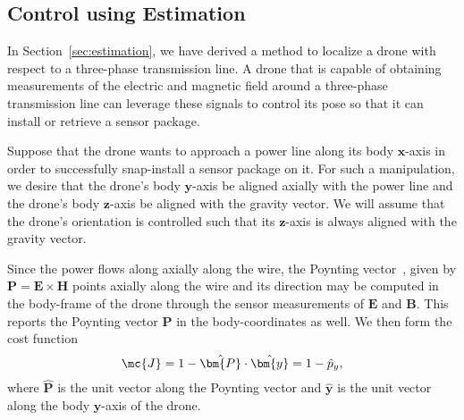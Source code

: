 % 
% 
% 
% 
\subsection{Control using Estimation}
\label{ssec:ctrl_w_est}

In Section~\ref{sec:estimation}, we have derived a method to localize a drone
with respect to a three-phase transmission line. A drone that is capable of
obtaining measurements of the electric and magnetic field around a three-phase
transmission line can leverage these signals to control its pose so that it can
install or retrieve a sensor package.

Suppose that the drone wants to approach a power line along its body
$\bm{x}$-axis in order to successfully snap-install a sensor package on it. For
such a manipulation, we desire that the drone's body $\bm{y}$-axis be aligned
axially with the power line and the drone's body $\bm{z}$-axis be aligned with
the gravity vector. We will assume that the drone's orientation is controlled
such that its $\bm{z}$-axis is always aligned with the gravity vector.

Since the power flows along axially along the wire, the Poynting
vector~\cite{griffiths2014introduction}, given by $\bm{P} = \bm{E} \times
\bm{H}$ points axially along the wire and its direction may be computed in the
body-frame of the drone through the sensor measurements of $\bm{E}$ and
$\bm{B}$. This reports the Poynting vector $\bm{P}$ in the body-coordinates as
well. We then form the cost function \[ \mc{J} = 1 - \hat{\bm{P}} \cdot
\hat{\bm{y}} = 1 -  \hat{p}_y, \] where $\hat{\bm{P}}$ is the unit vector along the
Poynting vector and $\hat{\bm{y}}$ is the unit vector along the body
$\bm{y}$-axis of the drone.

